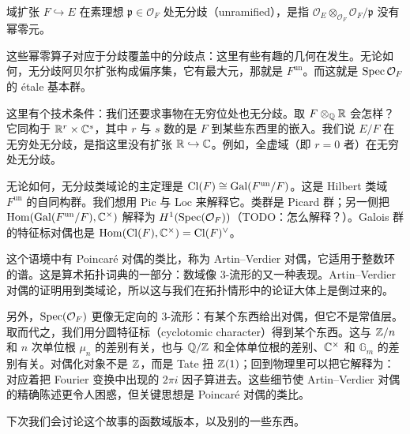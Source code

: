 \begin{definition}
  域扩张 $F\hookrightarrow E$ 在素理想 $\mathfrak{p}\in\mathcal{O}_F$ 处无分歧（unramified），是指 $\mathcal{O}_E\otimes_{\mathcal{O}_F}\mathcal{O}_F/\mathfrak{p}$ 没有幂零元。
\end{definition}

这些幂零算子对应于分歧覆盖中的分歧点：这里有些有趣的几何在发生。无论如何，无分歧阿贝尔扩张构成偏序集，它有最大元，那就是 $F^{\mathrm{un}}$。而这就是 $\operatorname{Spec}\mathcal{O}_F$ 的 étale 基本群。

这里有个技术条件：我们还要求事物在无穷位处也无分歧。取 $F\otimes_{\mathbb{Q}}\mathbb{R}$ 会怎样？它同构于 $\mathbb{R}^r\times\mathbb{C}^s$，其中 $r$ 与 $s$ 数的是 $F$ 到某些东西里的嵌入。我们说 $E/F$ 在无穷处无分歧，是指这里没有扩张 $\mathbb{R}\hookrightarrow\mathbb{C}$。例如，全虚域（即 $r = 0$ 者）在无穷处无分歧。

无论如何，无分歧类域论的主定理是 $\mathrm{Cl}(F)\cong\operatorname{Gal}(F^{\mathrm{un}}/F)$。这是 Hilbert 类域 $F^{\mathrm{un}}$ 的自同构群。我们想用 $\mathrm{Pic}$ 与 $\mathrm{Loc}$ 来解释它。类群是 Picard 群；另一侧把 $\operatorname{Hom}(\operatorname{Gal}(F^{\mathrm{un}}/F),\mathbb{C}^\times)$ 解释为 $H^1(\operatorname{Spec}(\mathcal{O}_F))$（TODO：怎么解释？）。Galois 群的特征标对偶也是 $\operatorname{Hom}(\mathrm{Cl}(F),\mathbb{C}^\times) = \mathrm{Cl}(F)^\vee$。

这个语境中有 Poincaré 对偶的类比，称为 Artin--Verdier 对偶，它适用于整数环的谱。这是算术拓扑词典的一部分：数域像 $3$-流形的又一种表现。Artin--Verdier 对偶的证明用到类域论，所以这与我们在拓扑情形中的论证大体上是倒过来的。


另外，$\operatorname{Spec}(\mathcal{O}_F)$ 更像无定向的 $3$-流形：有某个东西给出对偶，但它不是常值层。取而代之，我们用分圆特征标（cyclotomic character）得到某个东西。这与 $\mathbb{Z}/n$ 和 $n$ 次单位根 $\mu_n$ 的差别有关，也与 $\mathbb{Q}/\mathbb{Z}$ 和全体单位根的差别、$\mathbb{C}^\times$ 和 $\mathbb{G}_m$ 的差别有关。对偶化对象不是 $\mathbb{Z}$，而是 Tate 扭 $\mathbb{Z}(1)$；回到物理里可以把它解释为：对应着把 Fourier 变换中出现的 $2\pi i$ 因子算进去。这些细节使 Artin--Verdier 对偶的精确陈述更令人困惑，但关键思想是 Poincaré 对偶的类比。

下次我们会讨论这个故事的函数域版本，以及别的一些东西。
